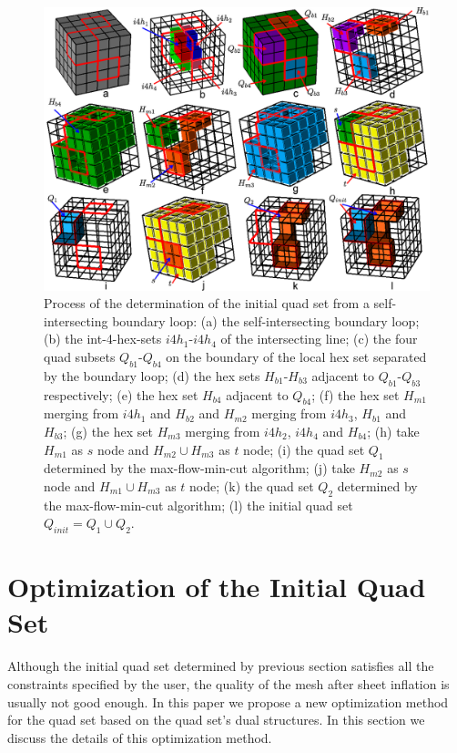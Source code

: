 \documentclass[final,5p,times,twocolumn]{elsarticle}
\begin{document}
\begin{figure}[htbp]
\begin{center}
\includegraphics[width=13cm]{int_init_qs.png}
\caption{Process of the determination of the initial quad set from a self-intersecting boundary loop: (a) the self-intersecting boundary loop; (b) the int-4-hex-sets $i4h_1$-$i4h_4$ of the intersecting line; (c) the four quad subsets $Q_{b1}$-$Q_{b4}$ on the boundary of the local hex set separated by the boundary loop; (d) the hex sets $H_{b1}$-$H_{b3}$ adjacent to $Q_{b1}$-$Q_{b3}$ respectively; (e) the hex set $H_{b4}$ adjacent to $Q_{b4}$; (f) the hex set $H_{m1}$ merging from $i4h_1$ and $H_{b2}$ and $H_{m2}$ merging from $i4h_3$, $H_{b1}$ and $H_{b3}$; (g) the hex set $H_{m3}$ merging from $i4h_2$, $i4h_4$ and $H_{b4}$; (h) take $H_{m1}$ as $s$ node and $H_{m2}\cup H_{m3}$ as $t$ node; (i) the quad set $Q_1$ determined by the max-flow-min-cut algorithm; (j) take $H_{m2}$ as $s$ node and $H_{m1} \cup H_{m3}$ as $t$ node; (k) the quad set $Q_2$ determined by the max-flow-min-cut algorithm; (l) the initial quad set $Q_{init}=Q_1 \cup Q_2$.}
\label{fig:int_init_qs}
\end{center}
\end{figure}

\section{Optimization of the Initial Quad Set}
\label{sec:opt_init_qs}
Although the initial quad set determined by previous section satisfies all the constraints specified by the user, the quality of the mesh after sheet inflation is usually not good enough. In this paper we propose a new optimization method for the quad set based on the quad set's dual structures. In this section we discuss the details of this optimization method.
\end{document}
